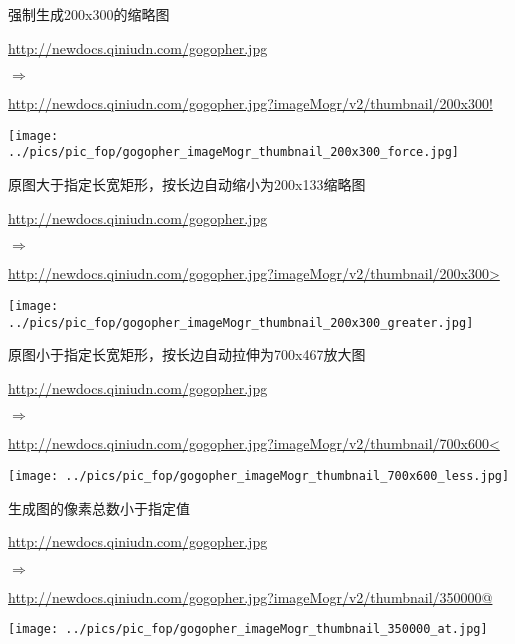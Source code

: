 \documentclass[11pt, oneside]{book}
\newcommand{\qsym}[1]{
\footnotesize
\noindent
#1\par
\normalsize
}
\newcommand{\qsamplelink}[1]{
\vspace{0.2em}
\noindent
#1\par
\vspace{0.1em}
}
\newcommand{\qurl}[1]{\footnotesize\url{#1}\normalsize}
\begin{document}
\begin{sample}
  \caption{强制生成200x300的缩略图}
    \qsamplelink{\qurl{http://newdocs.qiniudn.com/gogopher.jpg}}
    \qsym{$\Rightarrow$}
    \qsamplelink{\qurl{http://newdocs.qiniudn.com/gogopher.jpg?imageMogr/v2/thumbnail/200x300!}}

    \begin{center}
      \texttt{[image: ../pics/pic\_fop/gogopher\_imageMogr\_thumbnail\_200x300\_force.jpg]}
    \end{center}
  \label{imageMogr-thumbnail-200x300-force}
\end{sample}

\begin{sample}
  \caption{原图大于指定长宽矩形，按长边自动缩小为200x133缩略图}
    \qsamplelink{\qurl{http://newdocs.qiniudn.com/gogopher.jpg}}
    \qsym{$\Rightarrow$}
    \qsamplelink{\qurl{http://newdocs.qiniudn.com/gogopher.jpg?imageMogr/v2/thumbnail/200x300>}}

    \begin{center}
      \texttt{[image: ../pics/pic\_fop/gogopher\_imageMogr\_thumbnail\_200x300\_greater.jpg]}
    \end{center}
  \label{imageMogr-thumbnail-200x300-greater}
\end{sample}

\begin{sample}
  \caption{原图小于指定长宽矩形，按长边自动拉伸为700x467放大图}
    \qsamplelink{\qurl{http://newdocs.qiniudn.com/gogopher.jpg}}
    \qsym{$\Rightarrow$}
    \qsamplelink{\qurl{http://newdocs.qiniudn.com/gogopher.jpg?imageMogr/v2/thumbnail/700x600<}}

    \begin{center}
      \texttt{[image: ../pics/pic\_fop/gogopher\_imageMogr\_thumbnail\_700x600\_less.jpg]}
    \end{center}
  \label{imageMogr-thumbnail-700x600-less}
\end{sample}

\begin{sample}
  \caption{生成图的像素总数小于指定值}
    \qsamplelink{\qurl{http://newdocs.qiniudn.com/gogopher.jpg}}
    \qsym{$\Rightarrow$}
    \qsamplelink{\qurl{http://newdocs.qiniudn.com/gogopher.jpg?imageMogr/v2/thumbnail/350000@}}

    \begin{center}
      \texttt{[image: ../pics/pic\_fop/gogopher\_imageMogr\_thumbnail\_350000\_at.jpg]}
    \end{center}
  \label{imageMogr-thumbnail-350000-at}
\end{sample}
\end{document}
